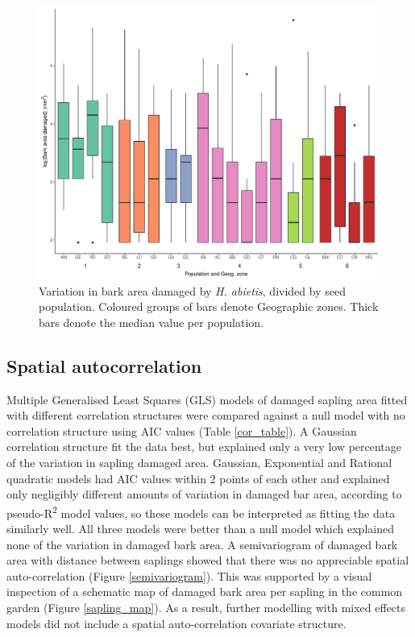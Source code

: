 \documentclass[a4paper, 11pt]{article}
\begin{document}
\begin{figure}
	\includegraphics[width=\textwidth]{boxplot}
	\caption{Variation in bark area damaged by \textit{H. abietis}, divided by seed population. Coloured groups of bars denote Geographic zones. Thick bars denote the median value per population.}
	\label{boxplot}
\end{figure}


\subsection*{Spatial autocorrelation}

Multiple Generalised Least Squares (GLS) models of damaged sapling area fitted with different correlation structures were compared against a null model with no correlation structure using AIC values (Table \ref{cor_table}). A Gaussian correlation structure fit the data best, but explained only a very low percentage of the variation in sapling damaged area. Gaussian, Exponential and Rational quadratic models had AIC values within 2 points of each other and explained only negligibly different amounts of variation in damaged bar area, according to pseudo-R\textsuperscript{2} model values, so these models can be interpreted as fitting the data similarly well. All three models were better than a null model which explained none of the variation in damaged bark area. A semivariogram of damaged bark area with distance between saplings showed that there was no appreciable spatial auto-correlation (Figure \ref{semivariogram}). This was supported by a visual inspection of a schematic map of damaged bark area per sapling in the common garden (Figure \ref{sapling_map}). As a result, further modelling with mixed effects models did not include a spatial auto-correlation covariate structure.
\end{document}

